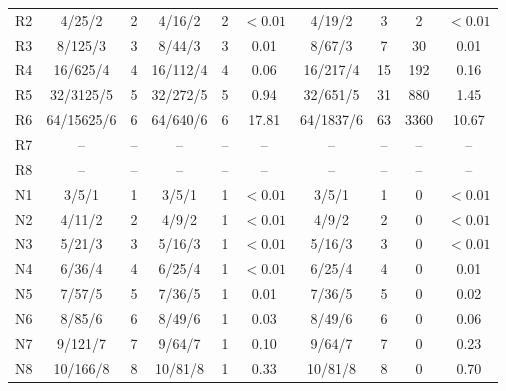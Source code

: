 \begin{table}[t]
\begin{tabular}{@{}lccccccccc@{}}
R2 & 4/25/2 & 2 & 4/16/2 & 2 & $<0.01$ & 4/19/2 & 3 & 2 & $<0.01$\\
R3 & 8/125/3 & 3 & 8/44/3 & 3 & 0.01 & 8/67/3 & 7 & 30 & 0.01\\
R4 & 16/625/4 & 4 & 16/112/4 & 4 & 0.06 & 16/217/4 & 15 & 192 & 0.16\\
R5 & 32/3125/5 & 5 & 32/272/5 & 5 & 0.94 & 32/651/5 & 31 & 880 & 1.45\\
R6 & 64/15625/6 & 6 & 64/640/6 & 6 & 17.81 & 64/1837/6 & 63 & 3360 & 10.67\\
R7 & -- & -- & -- & -- & -- & -- & -- & -- & --\\
R8 & -- & -- & -- & -- & -- & -- & -- & -- & --\\
N1 & 3/5/1 & 1 & 3/5/1 & 1 & $<0.01$ & 3/5/1 & 1 & 0 & $<0.01$\\
N2 & 4/11/2 & 2 & 4/9/2 & 1 & $<0.01$ & 4/9/2 & 2 & 0 & $<0.01$\\
N3 & 5/21/3 & 3 & 5/16/3 & 1 & $<0.01$ & 5/16/3 & 3 & 0 & $<0.01$\\
N4 & 6/36/4 & 4 & 6/25/4 & 1 & $<0.01$ & 6/25/4 & 4 & 0 & 0.01\\
N5 & 7/57/5 & 5 & 7/36/5 & 1 & 0.01 & 7/36/5 & 5 & 0 & 0.02\\
N6 & 8/85/6 & 6 & 8/49/6 & 1 & 0.03 & 8/49/6 & 6 & 0 & 0.06\\
N7 & 9/121/7 & 7 & 9/64/7 & 1 & 0.10 & 9/64/7 & 7 & 0 & 0.23\\
N8 & 10/166/8 & 8 & 10/81/8 & 1 & 0.33 & 10/81/8 & 8 & 0 & 0.70\\
\bottomrule
\end{tabular}
\end{table}
